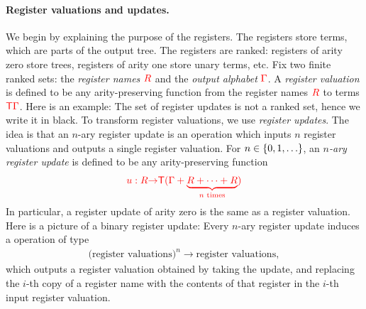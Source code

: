 


\paragraph*{Register valuations and updates.} We begin by explaining the purpose of the registers.  The registers store terms, which are parts of the output tree. The registers are ranked: registers of arity zero  store trees, registers of arity one store unary terms, etc.  Fix two finite ranked sets: the \emph{register names} ${{\color{red}{R}}}$ and the \emph{output alphabet} ${\color{red}{\Gamma}}$.
A \emph{register valuation} is defined to be any arity-preserving function from the register names ${{\color{red}{R}}}$ to terms ${\color{red}{\mathsf T}} {\color{red}{\Gamma}}$. Here is an example:
The set of register updates is not a ranked set, hence we write it in black.
To transform register valuations, we use \emph{register updates}.  The idea is that an $n$-ary register update is an operation which inputs $n$ register valuations and outputs a single register valuation. For  $n \in \{0,1,\ldots\}$, an \emph{$n$-ary register update}  is defined to be any arity-preserving function
\begin{align*}
    {\color{red}{u : {{\color{red}{R}}}{\color{red}{\to}}{\color{red}{\mathsf T}}( {\color{red}{\Gamma}}+ \underbrace{{{{\color{red}{R}}}+ \cdots + {{\color{red}{R}}}}}_{\text{$n$ times}})}}
\end{align*}
In particular, a register update of arity zero is the same as a register valuation.  
Here is a picture of a binary register update:
Every $n$-ary register update induces a operation of type 
\begin{align*}
\text{(register valuations)}^n \to \text{register valuations},
\end{align*}
which outputs a register valuation obtained by taking the update, and replacing the $i$-th copy of a register name with the  contents of that register in the $i$-th input register valuation. 

